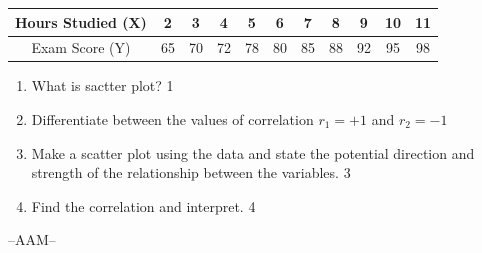 \documentclass[12pt]{article}
\begin{document}
\begin{enumerate}
\begin{table}[h!]
\centering
\begin{tabular}{c|c|c|c|c|c|c|c|c|c|c}
Hours Studied (X) & 2 & 3 & 4 & 5 & 6 & 7 & 8 & 9 & 10 & 11 \\ \hline
Exam Score (Y) & 65 & 70 & 72 & 78 & 80 & 85 & 88 & 92 & 95 & 98 \\
\end{tabular}
\end{table}

  \begin{enumerate}
    \item What is sactter plot? \hfill 1
  \item Differentiate between the values of correlation $r_1 = +1$ and $r_2=-1$
    \item  
	Make a scatter plot using the data and state the potential direction and strength of the relationship between the variables. \hfill 3
    \item
	Find the correlation and interpret. \hfill 4
  \end{enumerate}

\end{enumerate}
 \vspace{2.5cm}

\begin{center}

  \vfill
  --AAM--
\end{center}
\end{document}
